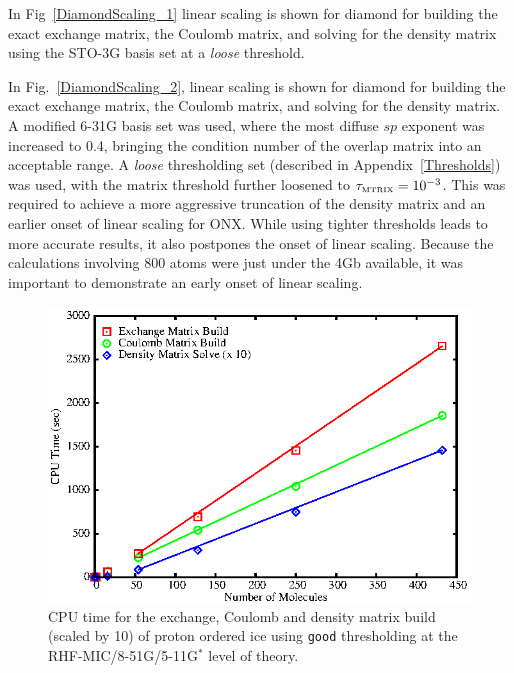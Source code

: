 \documentclass[prb,aps,nobibnotes,twocolumn,doublespace,twocolumngrid,superbib]{revtex4}
\begin{document}
In Fig~\ref{DiamondScaling_1}  linear scaling is shown for diamond for 
building the exact exchange matrix, the Coulomb matrix, and solving for the density matrix using the STO-3G 
basis set at a {\it loose} threshold.

In Fig.~\ref{DiamondScaling_2}, linear scaling is shown for diamond for 
building the exact exchange matrix, the Coulomb matrix, and solving for the density matrix. 
A modified 6-31G basis set was used, where the most diffuse $sp$ exponent was increased to 
0.4, bringing the condition number of the overlap matrix into an acceptable range.  A 
{\it loose} thresholding set (described in Appendix~\ref{Thresholds}) was used, with 
the matrix threshold further loosened to $\Huge \tau_{\rm \scriptscriptstyle MTRIX}=10^{-3}$.  
This was required to achieve a more aggressive truncation of the density matrix and an earlier 
onset of linear scaling for {\sc ONX}. While using tighter thresholds 
leads to more accurate results, it also postpones the onset of linear scaling. Because the 
calculations involving 800 atoms were just under the 4Gb available, it was important to 
demonstrate an early onset of linear scaling.  


\begin{figure}[h]
\caption{CPU time for the exchange, Coulomb and density 
matrix build (scaled by 10) of proton ordered ice using {\tt good}
thresholding at the RHF-MIC/8-51G/5-11G$^*$ level of theory.}
\label{IceScaling}
{\centering \includegraphics{Timing_pIce_ONX_1.ps} \par} 
\end{figure}
\end{document}
